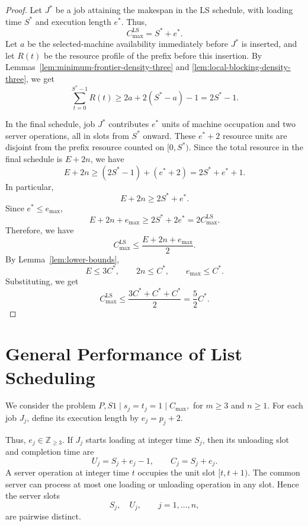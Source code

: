 \documentclass[11pt]{article}
\begin{document}
\begin{proof}
Let \(J^*\) be a job attaining the makespan in the LS schedule, with loading
time \(S^*\) and execution length \(e^*\). Thus, 
\[
        C_{\max}^{\mathrm{LS}}=S^*+e^* .
\]
Let \(a\) be the selected-machine availability immediately before \(J^*\) is
inserted, and let \(R(t)\) be the resource profile of the prefix before this
insertion. By Lemmas~\ref{lem:minimum-frontier-density-three} and
\ref{lem:local-blocking-density-three}, we get 
\[
        \sum_{t=0}^{S^*-1}R(t)
        \ge
        2a+2(S^*-a)-1
        =
        2S^*-1 .
\]

In the final schedule, job \(J^*\) contributes \(e^*\) units of machine occupation
and two server operations, all in slots from \(S^*\) onward. These \(e^*+2\)
resource units are disjoint from the prefix resource counted on
\([0,S^*)\). Since the total resource in the final schedule is \(E+2n\), we have 
\[
        E+2n
        \ge
        (2S^*-1)+(e^*+2)
        =
        2S^*+e^*+1 .
\]
In particular,
\[
        E+2n\ge2S^*+e^* .
\]
Since \(e^*\le e_{\max}\),
\[
        E+2n+e_{\max}
        \ge
        2S^*+2e^*
        =
        2C_{\max}^{\mathrm{LS}}.
\]
Therefore, we have
\[
        C_{\max}^{\mathrm{LS}}
        \le
        \frac{E+2n+e_{\max}}2 .
\]
By Lemma~\ref{lem:lower-bounds},
\[
        E\le3C^*,
        \qquad
        2n\le C^*,
        \qquad
        e_{\max}\le C^* .
\]
Substituting, we get
\[
        C_{\max}^{\mathrm{LS}}
        \le
        \frac{3C^*+C^*+C^*}{2}
        =
        \frac52 C^* .
\]
\end{proof}


\section{General Performance of List Scheduling}
\label{sec:ls-general-performance}

We consider the problem
$P,S1\mid s_j=t_j=1\mid C_{\max},$ for $
 m\ge 3$ and $n\ge 1 .$
For each job \(J_j\), define its execution length by
$e_j=p_j+2 .$

Thus,  \(e_j\in\mathbb Z_{\ge 3}\). If \(J_j\) starts loading at integer time
\(S_j\), then its unloading slot and completion time are
\[
U_j=S_j+e_j-1,
\qquad
C_j=S_j+e_j .
\]
A server operation at integer time \(t\) occupies the unit slot \([t,t+1)\).
The common server can process at most one loading or unloading operation in any
slot. Hence the server slots
\[
S_j,\quad U_j,\qquad j=1,\ldots,n,
\]
are pairwise distinct.
\end{document}
